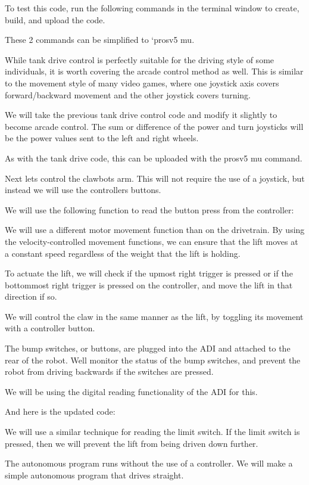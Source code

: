 To test this code, run the following commands in the terminal window to create, build, and upload the code.

These 2 commands can be simplified to {\ttfamily `prosv5 mu}.

While tank drive control is perfectly suitable for the driving style of some individuals, it is worth covering the arcade control method as well. This is similar to the movement style of many video games, where one joystick axis covers forward/backward movement and the other joystick covers turning.

We will take the previous tank drive control code and modify it slightly to become arcade control. The sum or difference of the power and turn joysticks will be the power values sent to the left and right wheels.

As with the tank drive code, this can be uploaded with the {\ttfamily prosv5 mu} command.

Next let\textquotesingle{}s control the clawbot\textquotesingle{}s arm. This will not require the use of a joystick, but instead we will use the controller\textquotesingle{}s buttons.

We will use the following function to read the button press from the controller\+:

We will use a different motor movement function than on the drivetrain. By using the velocity-\/controlled movement functions, we can ensure that the lift moves at a constant speed regardless of the weight that the lift is holding.

To actuate the lift, we will check if the upmost right trigger is pressed or if the bottommost right trigger is pressed on the controller, and move the lift in that direction if so.

We will control the claw in the same manner as the lift, by toggling its movement with a controller button.

The bump switches, or buttons, are plugged into the A\+DI and attached to the rear of the robot. We\textquotesingle{}ll monitor the status of the bump switches, and prevent the robot from driving backwards if the switches are pressed.

We will be using the digital reading functionality of the A\+DI for this.

And here is the updated code\+:

We will use a similar technique for reading the limit switch. If the limit switch is pressed, then we will prevent the lift from being driven down further.

The autonomous program runs without the use of a controller. We will make a simple autonomous program that drives straight. 